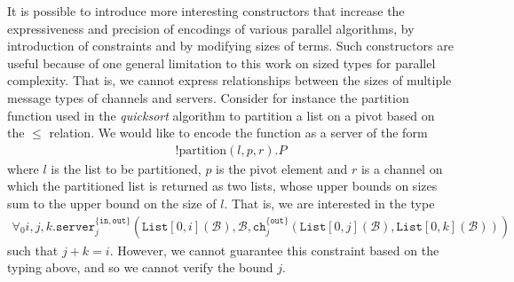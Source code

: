 It is possible to introduce more interesting constructors that increase the expressiveness and precision of encodings of various parallel algorithms, by introduction of constraints and by modifying sizes of terms. Such constructors are useful because of one general limitation to this work on sized types for parallel complexity. That is, we cannot express relationships between the sizes of multiple message types of channels and servers. Consider for instance the partition function used in the \textit{quicksort} algorithm to partition a list on a pivot based on the $\leq$ relation. We would like to encode the function as a server of the form
\begin{align*}
    !\text{partition}(l,p,r).P
\end{align*}
where $l$ is the list to be partitioned, $p$ is the pivot element and $r$ is a channel on which the partitioned list is returned as two lists, whose upper bounds on sizes sum to the upper bound on the size of $l$. That is, we are interested in the type
\begin{align*}
    \forall_0{i,j,k}.\texttt{server}^{\{\texttt{in},\texttt{out}\}}_{j}(\texttt{List}[0,i](\mathcal{B}),\mathcal{B},\texttt{ch}^{\{\texttt{out}\}}_j(\texttt{List}[0,j](\mathcal{B}),\texttt{List}[0,k](\mathcal{B})))
\end{align*}
such that $j+k=i$. However, we cannot guarantee this constraint based on the typing above, and so we cannot verify the bound $j$. 


